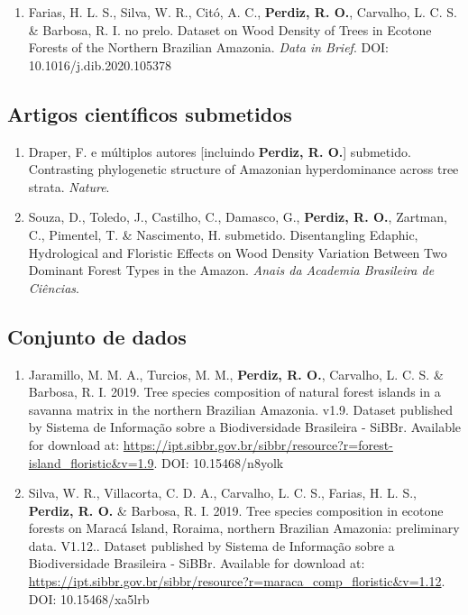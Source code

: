 \documentclass[11pt, a4paper]{awesome-cv}
\providecommand{\tightlist}{%
	\setlength{\itemsep}{0pt}\setlength{\parskip}{0pt}}
\begin{document}
\begin{enumerate}
\def\labelenumi{(\arabic{enumi})}
\setcounter{enumi}{17}
\tightlist
\item
  Farias, H. L. S., Silva, W. R., Citó, A. C., \textbf{Perdiz, R. O.}, Carvalho, L. C. S. \& Barbosa, R. I. no prelo. Dataset on Wood Density of Trees in Ecotone Forests of the Northern Brazilian Amazonia. \emph{Data in Brief}.
  DOI: 10.1016/j.dib.2020.105378
\end{enumerate}

\hypertarget{artigos-cientuxedficos-submetidos}{%
\subsection{Artigos científicos submetidos}\label{artigos-cientuxedficos-submetidos}}

\begin{enumerate}
\def\labelenumi{(\arabic{enumi})}
\setcounter{enumi}{18}
\item
  Draper, F. e múltiplos autores {[}incluindo \textbf{Perdiz, R. O.}{]} submetido. Contrasting phylogenetic structure of Amazonian hyperdominance across tree strata. \emph{Nature}.
\item
  Souza, D., Toledo, J., Castilho, C., Damasco, G., \textbf{Perdiz, R. O.}, Zartman, C., Pimentel, T. \& Nascimento, H. submetido. Disentangling Edaphic, Hydrological and Floristic Effects on Wood Density Variation Between Two Dominant Forest Types in the Amazon. \emph{Anais da Academia Brasileira de Ciências}.
\end{enumerate}

\hypertarget{conjunto-de-dados}{%
\subsection{Conjunto de dados}\label{conjunto-de-dados}}

\begin{enumerate}
\def\labelenumi{(\arabic{enumi})}
\tightlist
\item
  Jaramillo, M. M. A., Turcios, M. M., \textbf{Perdiz, R. O.}, Carvalho, L. C. S. \& Barbosa, R. I. 2019. Tree species composition of natural forest islands in a savanna matrix in the northern Brazilian Amazonia. v1.9. Dataset published by Sistema de Informação sobre a Biodiversidade Brasileira - SiBBr. Available for download at: \url{https://ipt.sibbr.gov.br/sibbr/resource?r=forest-island_floristic\&v=1.9}.
  DOI: 10.15468/n8yolk
\item
  Silva, W. R., Villacorta, C. D. A., Carvalho, L. C. S., Farias, H. L. S., \textbf{Perdiz, R. O.} \& Barbosa, R. I. 2019. Tree species composition in ecotone forests on Maracá Island, Roraima, northern Brazilian Amazonia: preliminary data. V1.12.. Dataset published by Sistema de Informação sobre a Biodiversidade Brasileira - SiBBr. Available for download at: \url{https://ipt.sibbr.gov.br/sibbr/resource?r=maraca_comp_floristic\&v=1.12}.
  DOI: 10.15468/xa5lrb
\end{enumerate}
\end{document}
